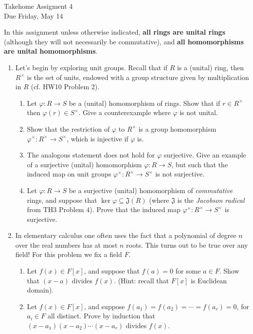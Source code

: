 \documentclass[11pt]{article}
\newcommand{\fJ}{\mathfrak{J}}
\begin{document}
\begin{center}
  \Large {Takehome Assigment 4}\\
  \small {Due Friday, May 14}
\end{center}
In this assignment unless otherwise indicated, \textbf{all rings are unital rings} (although they will not necessarily be commutative), and \textbf{all homomorphisms are unital homomorphisms}.
\begin{enumerate}
  \item{
  Let's begin by exploring unit groups. Recall that if $R$ is a (unital) ring, then $R^\times$ is the set of units, endowed with a group structure given by multiplication in $R$ (cf. HW10 Problem 2).
  \begin{enumerate}
    \item{
    Let $\varphi:R\to S$ be a (unital) homomorphism of rings.  Show that if $r\in R^\times$ then $\varphi(r)\in S^\times$.  Give a counterexample where $\varphi$ is not unital.
    }
    \item{
    Show that the restriction of $\varphi$ to $R^\times$ is a group homomorphism $\varphi^\times: R^\times\to S^\times$, which is injective if $\varphi$ is.
    }
    \item{
    The analogous statement does not hold for $\varphi$ surjective.  Give an example of a surjective (unital) homomorphism $\varphi:R\to S$, but such that the induced map on unit groups $\varphi^\times:R^\times\to S^\times$ is not surjective.
    }
    \item{
    Let $\varphi:R\to S$ be a surjective (unital) homomorphism of \textit{commutative} rings, and suppose that $\ker\varphi\subseteq\fJ(R)$ (where $\fJ$ is the \textit{Jacobson radical} from TH3 Problem 4).  Prove that the induced map $\varphi^\times:R^\times\to S^\times$ is surjective.
    }
  \end{enumerate}
  }
  \item{
  In elementary calculus one often uses the fact that a polynomial of degree $n$ over the real numbers has at most $n$ roots.  This turns out to be true over any field!  For this problem we fix a field $F$.
  \begin{enumerate}
    \item{
    Let $f(x)\in F[x]$, and suppose that $f(a)=0$ for some $a\in F$.  Show that $(x-a)$ divides $f(x)$.  (Hint: recall that $F[x]$ is Euclidean domain).
    }
    \item{
    Let $f(x)\in F[x]$, and suppose $f(a_1)=f(a_2)=\cdots=f(a_r)=0$, for $a_i\in F$ all distinct.  Prove by induction that $(x-a_1)(x-a_2)\cdots(x-a_r)$ divides $f(x)$.
}
\end{enumerate}}
\end{enumerate}
\end{document}
